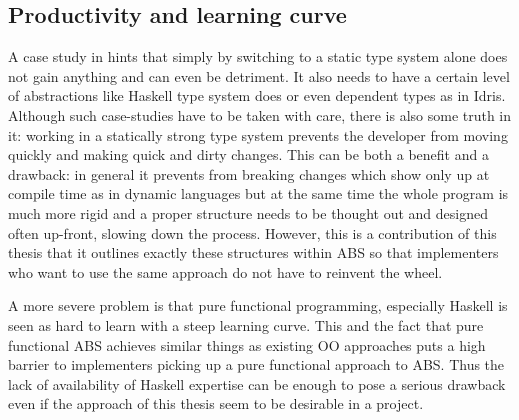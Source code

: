 
\subsection{Productivity and learning curve}
A case study in \cite{hanenberg_experiment_2010} hints that simply by switching to a static type system alone does not gain anything and can even be detriment. It also needs to have a certain level of abstractions like Haskell type system does or even dependent types as in Idris. Although such case-studies have to be taken with care, there is also some truth in it: working in a statically strong type system prevents the developer from moving quickly and making quick and dirty changes. This can be both a benefit and a drawback: in general it prevents from breaking changes which show only up at compile time as in dynamic languages but at the same time the whole program is much more rigid and a proper structure needs to be thought out and designed often up-front, slowing down the process. However, this is a contribution of this thesis that it outlines exactly these structures within ABS so that implementers who want to use the same approach do not have to reinvent the wheel.

A more severe problem is that pure functional programming, especially Haskell is seen as hard to learn with a steep learning curve. This and the fact that pure functional ABS achieves similar things as existing OO approaches puts a high barrier to implementers picking up a pure functional approach to ABS. Thus the lack of availability of Haskell expertise can be enough to pose a serious drawback even if the approach of this thesis seem to be desirable in a project.

